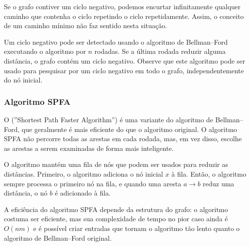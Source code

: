 Se o grafo contiver um ciclo negativo,
podemos encurtar infinitamente
qualquer caminho que contenha o ciclo repetindo o ciclo
repetidamente.
Assim, o conceito de um caminho mínimo
não faz sentido nesta situação.

Um ciclo negativo pode ser detectado
usando o algoritmo de Bellman–Ford
executando o algoritmo por $n$ rodadas.
Se a última rodada reduzir alguma distância,
o grafo contém um ciclo negativo.
Observe que este algoritmo pode ser usado para
pesquisar por
um ciclo negativo em todo o grafo,
independentemente do nó inicial.

\subsubsection{Algoritmo SPFA}


O  (''Shortest Path Faster Algorithm'') \cite{fan94}
é uma variante do algoritmo de Bellman–Ford,
que geralmente é mais eficiente do que o algoritmo original.
O algoritmo SPFA não percorre todas as arestas em cada rodada,
mas, em vez disso, escolhe as arestas a serem examinadas
de forma mais inteligente.

O algoritmo mantém uma fila de nós que podem
ser usados para reduzir as distâncias.
Primeiro, o algoritmo adiciona o nó inicial $x$
à fila.
Então, o algoritmo sempre processa o
primeiro nó na fila, e quando uma aresta
$a \rightarrow b$ reduz uma distância,
o nó $b$ é adicionado à fila.
% 
% 

A eficiência do algoritmo SPFA depende
da estrutura do grafo:
o algoritmo costuma ser eficiente,
mas sua complexidade de tempo no pior caso ainda é
$O(nm)$ e é possível criar entradas
que tornam o algoritmo tão lento quanto o
algoritmo de Bellman–Ford original.

